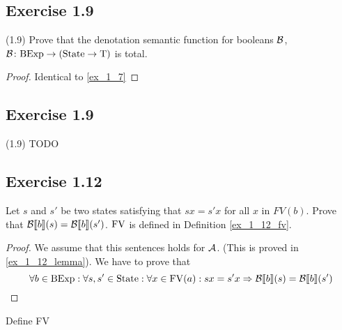 \documentclass[12pt,a4paper,oneside]{book}
\begin{document}
\subsection{Exercise 1.9}

\begin{exercise}{(1.9)}
	Prove that the denotation semantic function for booleans $\mathcal{B}$, $\mathord{\mathcal{B}}\colon\mathrm{BExp}\to(\mathrm{State} \to \mathrm{T})$ is total.
	
	\begin{proof}
		Identical to \ref{ex_1_7}
	\end{proof}
\end{exercise}

\subsection{Exercise 1.9}

\begin{exercise}{(1.9)}
	TODO
\end{exercise}

\subsection{Exercise 1.12}

\begin{exercise}
	Let $s$ and $s'$ be two states satisfying that $s x = s' x$ for all $x$ in $FV(b)$. Prove that $\mathcal{B} \llbracket b \rrbracket (s) = \mathcal{B} \llbracket b \rrbracket (s')$. $\mathrm{FV}$ is defined in Definition \ref{ex_1_12_fv}.
	
	\begin{proof}
		We assume that this sentences holds for $\mathcal{A}$. (This is proved in \ref{ex_1_12_lemma}). We have to prove that
		\[
		\forall b \in \mathrm{BExp} \mathrel{:} \forall s, s' \in \mathrm{State} \mathrel{:} \forall x \in \mathrm{FV}(a) \mathrel{:} sx = s'x \Rightarrow \mathcal{B} \llbracket b \rrbracket (s) = \mathcal{B} \llbracket b \rrbracket (s')
		\]
		
	\end{proof}
	
\end{exercise}

\begin{definition}
	\label{ex_1_12_fv}
	Define FV 
\end{definition}
\end{document}
